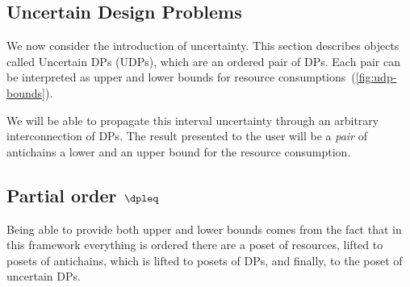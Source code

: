 \subsection{Uncertain Design Problems\label{sec:UDP}}

We now consider the introduction of uncertainty. This section describes
objects called Uncertain DPs (UDPs), which are an ordered pair of
DPs. Each pair can be interpreted as upper and lower bounds for resource
consumptions~(\cref{fig:udp-bounds}).


We will be able to propagate this interval uncertainty through an
arbitrary interconnection of DPs. The result presented to the user
will be a \emph{pair} of antichains \textemdash{} a lower and an upper
bound for the resource consumption.

\subsection{Partial order $\dpleq$}

Being able to provide both upper and lower bounds comes from the fact
that in this framework everything is ordered \textendash{} there are
a poset of resources, lifted to posets of antichains, which is lifted
to posets of DPs, and finally, to the poset of uncertain DPs.

